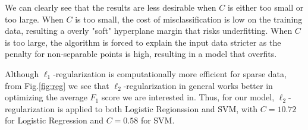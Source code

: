 We can clearly see that the results are less desirable when $C$ is either too small or too large. When $C$ is too small, the cost of misclassification is low on the training data, resulting a overly "soft" hyperplane margin that risks underfitting. When $C$ is too large, the algorithm is forced to explain the input data stricter as the penalty for non-separable points is high, resulting in a model that overfits.

Although $\ell_1$-regularization is computationally more efficient for sparse data, from Fig.\ref{fig:reg} we see that $\ell_2$-regularization in general works better in optimizing the average $F_1$ score we are interested in. Thus, for our model, $\ell_2$-regularization is applied to both Logistic Regionssion and SVM, with $C = 10.72$ for Logistic Regression and $C = 0.58$ for SVM.

